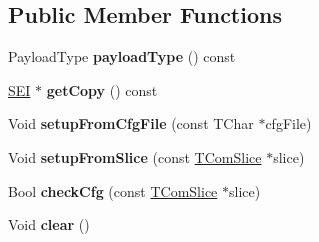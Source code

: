 \subsection*{Public Member Functions}
\begin{DoxyCompactItemize}
\item 
\mbox{\label{class_s_e_i_depth_representation_info_a4b15e28bb43677fb690f620f29fe17fc}} 
Payload\+Type {\bfseries payload\+Type} () const
\item 
\mbox{\label{class_s_e_i_depth_representation_info_a4fb0035141ec9c5e54f14c8bc6408ddf}} 
\hyperlink{class_s_e_i}{S\+EI} $\ast$ {\bfseries get\+Copy} () const
\item 
\mbox{\label{class_s_e_i_depth_representation_info_aad10bf2679868b058b7a9a89900a4f30}} 
Void {\bfseries setup\+From\+Cfg\+File} (const T\+Char $\ast$cfg\+File)
\item 
\mbox{\label{class_s_e_i_depth_representation_info_a57dea9e7c6d50166a7102d04bdb811f0}} 
Void {\bfseries setup\+From\+Slice} (const \hyperlink{class_t_com_slice}{T\+Com\+Slice} $\ast$slice)
\item 
\mbox{\label{class_s_e_i_depth_representation_info_af27ceb70c658142bcfa716dcc9fda84c}} 
Bool {\bfseries check\+Cfg} (const \hyperlink{class_t_com_slice}{T\+Com\+Slice} $\ast$slice)
\item 
\mbox{\label{class_s_e_i_depth_representation_info_a834a34093d96319de80dfd9af3bad18f}} 
Void {\bfseries clear} ()
\end{DoxyCompactItemize}
